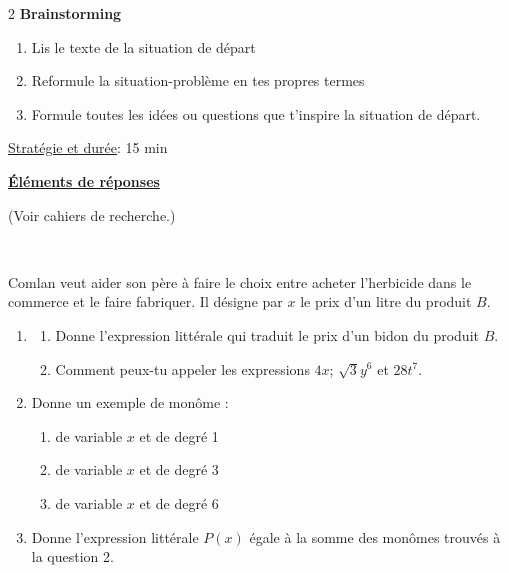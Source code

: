 \begin{multicols*}{2}
  	 \textbf{ Brainstorming}\\
  	\begin{enumerate}
  		\item  Lis le texte de la situation de départ 
  		\item  Reformule la situation-problème en tes 
  		propres termes 
  		\item  Formule toutes les idées ou questions que 
  		t’inspire la situation de départ.
  	\end{enumerate}
  	
  	\underline{Stratégie et durée}: 15 min
  	\begin{center}
  		\underline{\textbf{Éléments de réponses}}
  	\end{center}
  	(Voir cahiers de recherche.)
  	
  	\\
  	
  	Comlan veut aider son père à faire le choix entre acheter l'herbicide  dans le commerce et le faire fabriquer. Il désigne par $x$ le prix d'un litre du produit $B$.
  	
  	\begin{enumerate}
  		\item 
  		\begin{enumerate}
  			\item  Donne l'expression littérale qui traduit le prix d'un bidon du produit $B$.
  			
  			\item  Comment peux-tu appeler les expressions $4x$; $\sqrt{3}y^6$ et $28t^7$.
  		\end{enumerate}
  		\item Donne un exemple de monôme :
  		\begin{enumerate}
  			\item de variable $x$ et de degré 1
  			\item  de variable $x$ et de degré 3
  			\item  de variable $x$ et de degré 6
  		\end{enumerate}
  		\item  Donne l'expression littérale $P(x)$ égale à la somme des monômes trouvés à la question 2. 
  		

\end{enumerate}
\end{multicols*}
